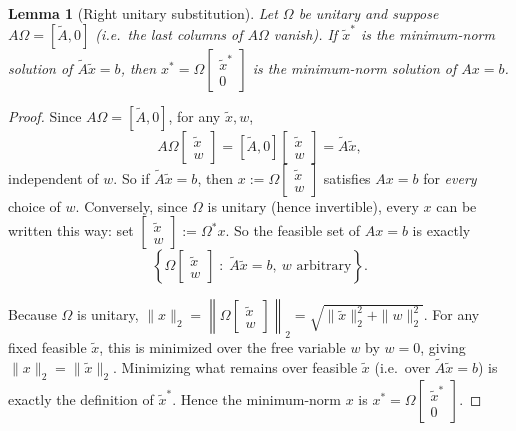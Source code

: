 \documentclass[11pt]{article}
\newtheorem{lemma}{Lemma}
\begin{document}
\begin{lemma}[Right unitary substitution]
\label{lem:orthogonal}
Let $\Omega$ be unitary and suppose $A\Omega=[\tilde A,0]$ (i.e.\ the last
columns of $A\Omega$ vanish). If $\tilde x^*$ is the minimum-norm solution of
$\tilde A\tilde x=b$, then $x^*=\Omega\begin{bmatrix}\tilde x^*\\0\end{bmatrix}$ is
the minimum-norm solution of $Ax=b$.
\end{lemma}
\begin{proof}
Since $A\Omega=[\tilde A,0]$, for any $\tilde x,w$,
\[
A\Omega\begin{bmatrix}\tilde x\\w\end{bmatrix} = [\tilde A,0]\begin{bmatrix}\tilde x\\w\end{bmatrix} = \tilde A\tilde x,
\]
independent of $w$. So if $\tilde A\tilde x=b$, then $x:=\Omega\begin{bmatrix}\tilde x\\w\end{bmatrix}$
satisfies $Ax=b$ for \emph{every} choice of $w$. Conversely, since $\Omega$ is
unitary (hence invertible), every $x$ can be written this way: set
$\begin{bmatrix}\tilde x\\w\end{bmatrix}:=\Omega^*x$. So the feasible set of
$Ax=b$ is exactly
\[
\left\{\Omega\begin{bmatrix}\tilde x\\w\end{bmatrix} \;:\; \tilde A\tilde x=b,\ w\text{ arbitrary}\right\}.
\]

Because $\Omega$ is unitary, $\|x\|_2=\left\|\Omega\begin{bmatrix}\tilde x\\w\end{bmatrix}\right\|_2
=\sqrt{\|\tilde x\|_2^2+\|w\|_2^2}$. For any fixed feasible $\tilde x$, this is
minimized over the free variable $w$ by $w=0$, giving $\|x\|_2=\|\tilde x\|_2$.
Minimizing what remains over feasible $\tilde x$ (i.e.\ over $\tilde A\tilde x=b$)
is exactly the definition of $\tilde x^*$. Hence the minimum-norm $x$ is
$x^*=\Omega\begin{bmatrix}\tilde x^*\\0\end{bmatrix}$.
\end{proof}
\end{document}
